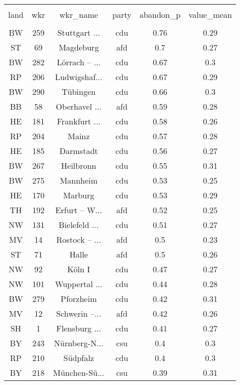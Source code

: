 
\begin{table}[!htbp] \centering 
  \caption{} 
  \label{} 
\begin{tabular}{@{\extracolsep{5pt}} cccccc} 
\\[-1.8ex]\hline 
\hline \\[-1.8ex] 
land & wkr & wkr\_name & party & abandon\_p & value\_mean \\ 
\hline \\[-1.8ex] 
BW & 259 & Stuttgart ... & cdu & 0.76 & 0.29 \\ 
ST & 69 & Magdeburg & afd & 0.7 & 0.27 \\ 
BW & 282 & Lörrach – ... & cdu & 0.67 & 0.3 \\ 
RP & 206 & Ludwigshaf... & cdu & 0.67 & 0.29 \\ 
BW & 290 & Tübingen & cdu & 0.66 & 0.3 \\ 
BB & 58 & Oberhavel ... & afd & 0.59 & 0.28 \\ 
HE & 181 & Frankfurt ... & cdu & 0.58 & 0.26 \\ 
RP & 204 & Mainz & cdu & 0.57 & 0.28 \\ 
HE & 185 & Darmstadt & cdu & 0.56 & 0.27 \\ 
BW & 267 & Heilbronn & cdu & 0.55 & 0.31 \\ 
BW & 275 & Mannheim & cdu & 0.53 & 0.25 \\ 
HE & 170 & Marburg & cdu & 0.53 & 0.29 \\ 
TH & 192 & Erfurt – W... & afd & 0.52 & 0.25 \\ 
NW & 131 & Bielefeld ... & cdu & 0.51 & 0.27 \\ 
MV & 14 & Rostock – ... & afd & 0.5 & 0.23 \\ 
ST & 71 & Halle & afd & 0.5 & 0.26 \\ 
NW & 92 & Köln I & cdu & 0.47 & 0.27 \\ 
NW & 101 & Wuppertal ... & cdu & 0.44 & 0.28 \\ 
BW & 279 & Pforzheim & cdu & 0.42 & 0.31 \\ 
MV & 12 & Schwerin –... & afd & 0.42 & 0.26 \\ 
SH & 1 & Flensburg ... & cdu & 0.41 & 0.27 \\ 
BY & 243 & Nürnberg-N... & csu & 0.4 & 0.3 \\ 
RP & 210 & Südpfalz & cdu & 0.4 & 0.3 \\ 
BY & 218 & München-Sü... & csu & 0.39 & 0.31 \\ 

\end{tabular}
\end{table}

